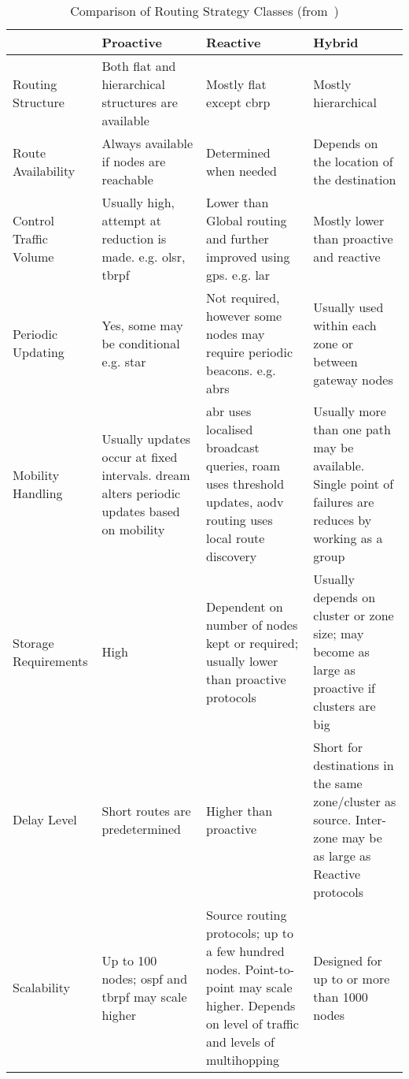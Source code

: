 \begin{table}[H]\centering
	\caption[Comparison of Routing Strategy Classes]{Comparison of Routing Strategy Classes (from~\citet{Abolhasan2004})}
	\label{tab:routing_categories}
	\begin{tabularx}{\textwidth}{p{2cm}|XXX}\toprule
		\diagbox[width=2cm, height=1.8cm]{Area}{Class} & Proactive & Reactive & Hybrid \\ \midrule
		Routing Structure & 
		Both flat and hierarchical structures are available &
		Mostly flat except \gls{cbrp} &
		Mostly hierarchical \\
		Route Availability &
		Always available if nodes are reachable &
		Determined when needed &
		Depends on the location of the destination \\
		Control Traffic Volume &
		Usually high, attempt at reduction is made. e.g. \gls{olsr}, \gls{tbrpf} &
		Lower than Global routing and further improved using \gls{gps}. e.g. \gls{lar} &
		Mostly lower than proactive and reactive \\
		Periodic Updating &
		Yes, some may be conditional e.g. \gls{star} &
		Not required, however some nodes may require periodic beacons. e.g. \glspl{abr} &
		Usually used within each zone or between gateway nodes \\
		Mobility Handling &
		Usually updates occur at fixed intervals. \gls{dream} alters periodic updates based on mobility &
		\gls{abr} uses localised broadcast queries, \gls{roam} uses threshold updates, \gls{aodv} routing uses local route discovery &
		Usually more than one path may be available. Single point of failures are reduces by working as a group\\
		Storage Requirements &
		High &
		Dependent on number of nodes kept or required; usually lower than proactive protocols &
		Usually depends on cluster or zone size; may become as large as proactive if clusters are big \\
		Delay Level &
		Short routes are predetermined &
		Higher than proactive &
		Short for destinations in the same zone/cluster as source. Inter-zone may be as large as Reactive protocols\\
		Scalability &
		Up to 100 nodes; \gls{ospf} and \gls{tbrpf} may scale higher &
		Source routing protocols; up to a few hundred nodes. Point-to-point may scale higher. Depends on level of traffic and levels of multihopping&
		Designed for up to or more than 1000 nodes \\
		\bottomrule
	\end{tabularx}
\end{table}



